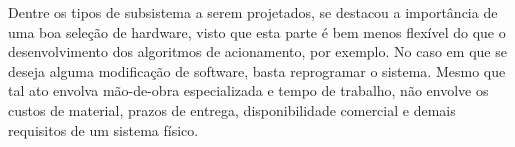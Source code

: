 Dentre os tipos de subsistema a serem projetados, se destacou a importância de uma boa seleção de hardware, visto que esta parte é bem menos flexível do que o desenvolvimento dos algoritmos de acionamento, por exemplo. No caso em que se deseja alguma modificação de software, basta reprogramar o sistema. Mesmo que tal ato envolva mão-de-obra especializada e tempo de trabalho, não envolve os custos de material, prazos de entrega, disponibilidade comercial e demais requisitos de um sistema físico.

